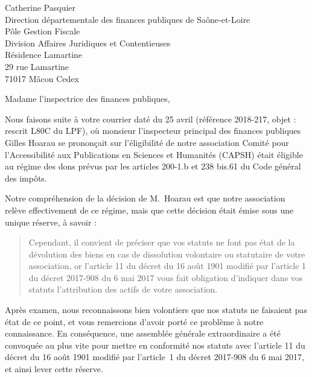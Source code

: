 \documentclass[11pt]{lettre}
\makeatletter
\newcommand*{\NoRule}{\renewcommand*{\rule@length}{0}}
\makeatother
\begin{document}
\begin{letter}{Catherine Pasquier\\Direction départementale des finances publiques de Saône-et-Loire\\Pôle Gestion Fiscale\\Division Affaires Juridiques et Contentieuses\\Résidence Lamartine\\29 rue Lamartine\\71017 Mâcon Cedex}
\NoRule
{}
\signature{}
\address{Antoine Amarilli (TODO adresse omise)}
\nofax
{}
\telephone{}
\email{}
\opening{Madame l'inspectrice des finances publiques,}

Nous faisons suite à votre courrier daté du 25 avril (référence 2018-217, objet
  : rescrit L80C du LPF), où monsieur l'inspecteur principal des
  finances publiques Gilles Hoarau se prononçait sur l'éligibilité de notre
  association Comité pour l'Accessibilité aux Publications en Sciences et
  Humanités (CAPSH) était éligible au régime des dons prévus par les articles
  200-1.b et 238 bis.61 du Code général des impôts.

Notre compréhension de la décision de M.\ Hoarau est que notre association
  relève effectivement de ce régime, mais que cette décision était émise sous
  une unique réserve, à savoir : 

\begin{quote}
  \og Cependant, il convient de préciser que
vos statuts ne font pas état de la dévolution des biens en cas de dissolution
volontaire ou statutaire de votre association, or l'article 11 du décret du 16
août 1901 modifié par l'article 1 du décret 2017-908 du 6 mai 2017 vous fait
obligation d'indiquer dans vos statuts l'attribution des actifs de votre
association. \fg
\end{quote}

Après examen, nous reconnaissons bien volontiers que nos statuts ne faisaient
  pas état de ce point, et vous remercions d'avoir porté ce problème à notre
  connaissance. En conséquence, une assemblée générale extraordinaire a été
  convoquée au plus vite pour mettre en conformité nos statuts avec l'article 11 du décret du
  16 août 1901 modifié par l'article~1 du décret 2017-908 du 6 mai 2017, et
  ainsi lever cette réserve.

  \pagebreak


\end{letter}
\end{document}
